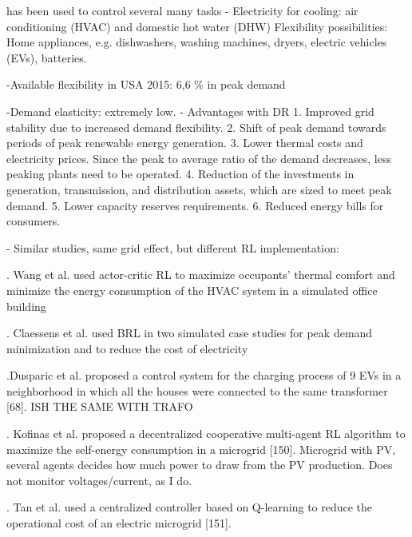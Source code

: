 \documentclass[class=book, crop=false]{standalone}
\begin{document}
has been used to control several many tasks 
- Electricity for cooling: air conditioning (HVAC) and domestic hot water (DHW)
Flexibility possibilities: Home appliances, e.g. dishwashers, washing machines, dryers,
electric vehicles (EVs), batteries. 

-Available flexibility in USA 2015: 6,6 \% in peak demand

-Demand elasticity: extremely low.
\cite{active_network_management}
- Advantages with DR
1. Improved grid stability due to increased demand flexibility.
2. Shift of peak demand towards periods of peak renewable energy
generation.
3. Lower thermal costs and electricity prices. Since the peak to average
ratio of the demand decreases, less peaking plants need to be operated.
4. Reduction of the investments in generation, transmission, and distribution assets, which are sized to meet peak demand.
5. Lower capacity reserves requirements.
6. Reduced energy bills for consumers.

- Similar studies, same grid effect, but different RL implementation:


. Wang et al. used actor-critic RL to maximize occupants’
thermal comfort and minimize the energy consumption of the HVAC
system in a simulated office building

. Claessens et al. used BRL in
two simulated case studies for peak demand minimization and to reduce the cost of electricity

.Dusparic et al. proposed a control system for the charging process of
9 EVs in a neighborhood in which all the houses were connected to the
same transformer [68]. ISH THE SAME WITH TRAFO

. Kofinas et al. proposed a decentralized cooperative multi-agent
RL algorithm to maximize the self-energy consumption in a microgrid
[150]. Microgrid with PV, several agents decides how much power to draw from the PV production.
Does not monitor voltages/current, as I do. 

. Tan et al. used a centralized controller based on Q-learning
to reduce the operational cost of an electric microgrid [151].
\end{document}
